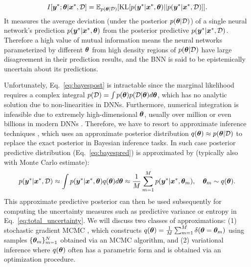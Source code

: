 \[I[\bm{y}^*; \bm{\theta} | \bm{x}^*, \mathcal{D}] = \mathbb{E}_{p(\bm{\theta} | \mathcal{D})} [\mathrm{KL}[ p(\bm{y}^* | \bm{x}^*, \bm{\theta}) || p(\bm{y}^* | \bm{x}^*, \mathcal{D})]]. \]
%
It measures the average deviation (under the posterior $p(\bm{\theta} | \mathcal{D})$) of a single neural network's prediction $p(\bm{y}^* | \bm{x}^*, \bm{\theta})$ from the posterior predictive $p(\bm{y}^* | \bm{x}^*, \mathcal{D})$. Therefore a high value of mutual information means the neural networks parameterized by different $\bm{\theta}$ from high density regions of $p(\bm{\theta} | \mathcal{D})$ have large disagreement in their prediction results, and the BNN is said to be epistemically uncertain about its predictions.

%
Unfortunately, Eq.~\eqref{eq:bayespost} is intractable since the marginal likelihood requires a complex integral $p(\mathcal{D})=\int p(\bm{\theta})p(\mathcal{D}|\bm{\theta})d\bm{\theta}$, which has no analytic solution due to non-linearities in DNNs. Furthermore, numerical integration is infeasible due to extremely high-dimensional $\bm{\theta}$, usually over million or even billions in modern DNNs \citep{krizhevsky2012imagenet,dehghani2023scaling}. Therefore, we have to resort to approximate inference techniques \citep{li2018approx}, which uses an approximate posterior distribution $q(\bm{\theta}) \approx p(\bm{\theta} | \mathcal{D})$ to replace the exact posterior in Bayesian inference tasks. In such case posterior predictive distribution (Eq.~\eqref{eq:bayespred}) is approximated by (typically also with Monte Carlo estimate):
\begin{equation}
    p(\bm{y}^* | \bm{x}^*, \mathcal{D}) \approx \int p(\bm{y}^\ast|\bm{x}^\ast,\bm{\theta}) q(\bm{\theta}) d\bm{\theta} \approx \frac{1}{M} \sum_{m=1}^M p(\bm{y}^\ast|\bm{x}^\ast,\bm{\theta}_m), \quad \bm{\theta}_m \sim q(\bm{\theta}).
\label{eq:approximate_predictive_distribution}
\end{equation}
This approximate predictive posterior can then be used subsequently for computing the uncertainty measures such as predictive variance or entropy in Eq.~\eqref{eq:total_uncertainty}.
%
We will discuss two classes of approximations: (1) stochastic gradient MCMC \citep{welling2011bayesian,chen2014stochastic}, which constructs $q(\bm{\theta}) = \frac{1}{M} \sum_{m=1}^M \delta(\bm{\theta} = \bm{\theta}_m)$ using samples $\{ \bm{\theta}_{m} \}_{m=1}^N$ obtained via an MCMC algorithm, and (2) variational inference \citep{beal:vi2003,jordan1999vi} where $q(\bm{\theta})$ often has a parametric form and is obtained via an optimization procedure. 


